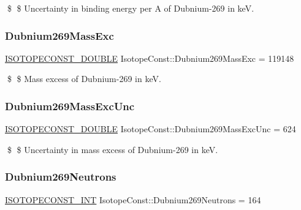 \$ \$ Uncertainty in binding energy per A of Dubnium-\/269 in keV. \mbox{\label{group___isotope_const-_dubnium-_db269_gab05fbbbc50221770b6b657897e3211bd}} 
\subsubsection{\texorpdfstring{Dubnium269\+Mass\+Exc}{Dubnium269MassExc}}
{\footnotesize\ttfamily \mbox{\hyperlink{group___isotope_const-_macros_ga8f45a7272ce02c0b4c65c44636ed719a}{I\+S\+O\+T\+O\+P\+E\+C\+O\+N\+S\+T\+\_\+\+D\+O\+U\+B\+LE}} Isotope\+Const\+::\+Dubnium269\+Mass\+Exc = 119148}

\$ \$ Mass excess of Dubnium-\/269 in keV. \mbox{\label{group___isotope_const-_dubnium-_db269_gab183fe6ee8292edc105e0d19fc47d3ac}} 
\subsubsection{\texorpdfstring{Dubnium269\+Mass\+Exc\+Unc}{Dubnium269MassExcUnc}}
{\footnotesize\ttfamily \mbox{\hyperlink{group___isotope_const-_macros_ga8f45a7272ce02c0b4c65c44636ed719a}{I\+S\+O\+T\+O\+P\+E\+C\+O\+N\+S\+T\+\_\+\+D\+O\+U\+B\+LE}} Isotope\+Const\+::\+Dubnium269\+Mass\+Exc\+Unc = 624}

\$ \$ Uncertainty in mass excess of Dubnium-\/269 in keV. \mbox{\label{group___isotope_const-_dubnium-_db269_ga68277438e2c94fc0123697689a5fde04}} 
\subsubsection{\texorpdfstring{Dubnium269\+Neutrons}{Dubnium269Neutrons}}
{\footnotesize\ttfamily \mbox{\hyperlink{group___isotope_const-_macros_ga5f18360b3e99483a35c32d789e62621c}{I\+S\+O\+T\+O\+P\+E\+C\+O\+N\+S\+T\+\_\+\+I\+NT}} Isotope\+Const\+::\+Dubnium269\+Neutrons = 164}

